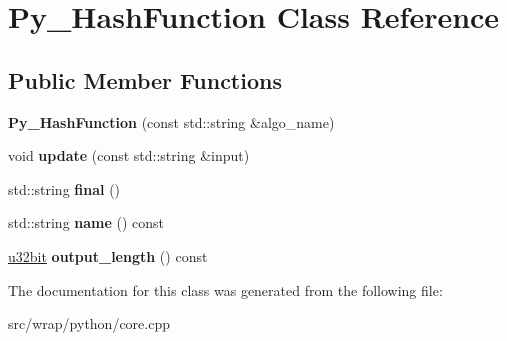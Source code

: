 \hypertarget{classPy__HashFunction}{\section{Py\-\_\-\-Hash\-Function Class Reference}
\label{classPy__HashFunction}
}
\subsection*{Public Member Functions}
\begin{DoxyCompactItemize}
\item 
\hypertarget{classPy__HashFunction_ab883c37a20afb528752d14b23b300bd7}{{\bfseries Py\-\_\-\-Hash\-Function} (const std\-::string \&algo\-\_\-name)}\label{classPy__HashFunction_ab883c37a20afb528752d14b23b300bd7}

\item 
\hypertarget{classPy__HashFunction_a2a2474a668628a53e41e0e138c63000a}{void {\bfseries update} (const std\-::string \&input)}\label{classPy__HashFunction_a2a2474a668628a53e41e0e138c63000a}

\item 
\hypertarget{classPy__HashFunction_a6a38f1cec20b1c68a6e4bdd7fa807f4d}{std\-::string {\bfseries final} ()}\label{classPy__HashFunction_a6a38f1cec20b1c68a6e4bdd7fa807f4d}

\item 
\hypertarget{classPy__HashFunction_ad3587daa22916003e6b7ac2bf597c2c7}{std\-::string {\bfseries name} () const }\label{classPy__HashFunction_ad3587daa22916003e6b7ac2bf597c2c7}

\item 
\hypertarget{classPy__HashFunction_a34f0a5b3d372aa58a1dc2bdf1aa67227}{\hyperlink{namespaceBotan_aacc7d03c95e97e76168fc1c819031830}{u32bit} {\bfseries output\-\_\-length} () const }\label{classPy__HashFunction_a34f0a5b3d372aa58a1dc2bdf1aa67227}

\end{DoxyCompactItemize}


The documentation for this class was generated from the following file\-:\begin{DoxyCompactItemize}
\item 
src/wrap/python/core.\-cpp\end{DoxyCompactItemize}
